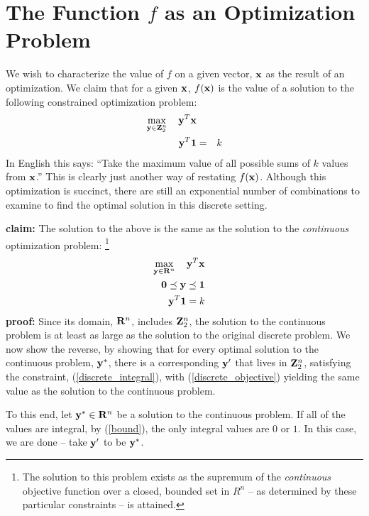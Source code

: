 \documentclass[12pt]{article}
\begin{document}
\section{The Function $f$ as an Optimization Problem}
We wish to characterize the value of $f$ on a given vector, ${\bf x}$ as 
the result of an optimization.
We claim that for a given ${\bf x}$, $f({\bf x})$ is the value of 
a solution to the following constrained optimization problem:%
\begin{eqnarray}
	\mathop{\rm max}_{{\bf y} \in {\bf Z}_2^n}\limits \quad {\bf y}^T {\bf x} && \label{discrete_objective} \\
{\bf y}^T {\bf 1} & = & k \label{discrete_integral} 
\end{eqnarray}
In English this says: ``Take the maximum value of all possible sums of $k$ 
values from ${\bf x}$.'' This is clearly just another way of restating $f({\bf x})$.
Although this optimization is succinct, there are still an exponential number 
of combinations to examine to find the optimal solution in this discrete setting.

{\bf claim:} The solution to the above is the same as the solution to the 
{\it continuous\/} optimization problem:%
\footnote{%
The solution to this problem exists as the supremum of the {\it continuous\/}
objective function over a closed, bounded set in $R^n$ -- 
as determined by these particular constraints -- is attained.
}
\begin{eqnarray}
\mathop{\rm max}_{{\bf y} \in {\bf R}^n}\limits \quad {\bf y}^T {\bf x} &&  \\
{\bf 0} \preceq {\bf y}   \preceq  {\bf 1}&& \label{bound} \\ 
{\bf y}^T {\bf 1}  =  k && \label{integral} 
\end{eqnarray}
{\bf proof:}
Since its domain, ${\bf R}^n$, 
includes ${\bf Z}_2^n$, the solution to the continuous problem is at least as 
large as the solution to the original discrete problem.
We now show the reverse, by showing that for every optimal solution to the 
continuous problem, ${\bf y}^*$, there is a corresponding ${\bf y}^\prime$ that 
lives in ${\bf Z}_2^n$, satisfying the constraint, (\ref{discrete_integral}), 
with (\ref{discrete_objective}) yielding the same value as the solution to the
continuous problem.

To this end, let ${\bf y}^* \in {\bf R}^n$ be a solution to the continuous 
problem. If all of the values are integral, by (\ref{bound}), 
the only integral values are $0$ or $1$. In this case, we are done -- take 
${\bf y}^\prime$ to be ${\bf y}^*$.
\end{document}
